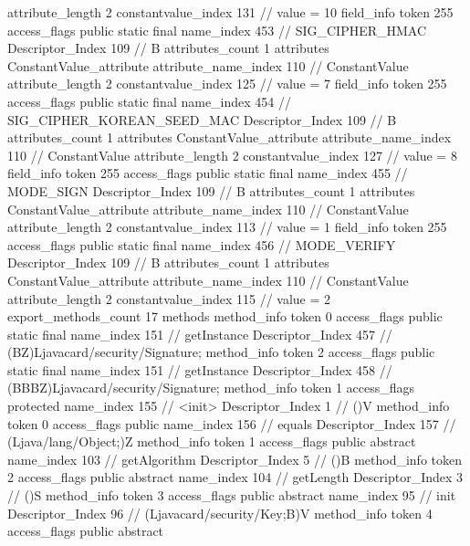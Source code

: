 {{{{{{{					attribute_length	2
					constantvalue_index	131		// value = 10
				}
				}
			}
			field_info {
				token	255
				access_flags	public static final
				name_index	453		// SIG_CIPHER_HMAC
				Descriptor_Index	109		// B
				attributes_count	1
				attributes {
				ConstantValue_attribute {
					attribute_name_index	110		// ConstantValue
					attribute_length	2
					constantvalue_index	125		// value = 7
				}
				}
			}
			field_info {
				token	255
				access_flags	public static final
				name_index	454		// SIG_CIPHER_KOREAN_SEED_MAC
				Descriptor_Index	109		// B
				attributes_count	1
				attributes {
				ConstantValue_attribute {
					attribute_name_index	110		// ConstantValue
					attribute_length	2
					constantvalue_index	127		// value = 8
				}
				}
			}
			field_info {
				token	255
				access_flags	public static final
				name_index	455		// MODE_SIGN
				Descriptor_Index	109		// B
				attributes_count	1
				attributes {
				ConstantValue_attribute {
					attribute_name_index	110		// ConstantValue
					attribute_length	2
					constantvalue_index	113		// value = 1
				}
				}
			}
			field_info {
				token	255
				access_flags	public static final
				name_index	456		// MODE_VERIFY
				Descriptor_Index	109		// B
				attributes_count	1
				attributes {
				ConstantValue_attribute {
					attribute_name_index	110		// ConstantValue
					attribute_length	2
					constantvalue_index	115		// value = 2
				}
				}
			}
			}
			export_methods_count	17
			methods {
				method_info {
					token	0
					access_flags	public static final
					name_index	151		// getInstance
					Descriptor_Index	457		// (BZ)Ljavacard/security/Signature;
				}
				method_info {
					token	2
					access_flags	public static final
					name_index	151		// getInstance
					Descriptor_Index	458		// (BBBZ)Ljavacard/security/Signature;
				}
				method_info {
					token	1
					access_flags	protected
					name_index	155		// <init>
					Descriptor_Index	1		// ()V
				}
				method_info {
					token	0
					access_flags	public
					name_index	156		// equals
					Descriptor_Index	157		// (Ljava/lang/Object;)Z
				}
				method_info {
					token	1
					access_flags	public abstract
					name_index	103		// getAlgorithm
					Descriptor_Index	5		// ()B
				}
				method_info {
					token	2
					access_flags	public abstract
					name_index	104		// getLength
					Descriptor_Index	3		// ()S
				}
				method_info {
					token	3
					access_flags	public abstract
					name_index	95		// init
					Descriptor_Index	96		// (Ljavacard/security/Key;B)V
				}
				method_info {
					token	4
					access_flags	public abstract
}}}}}
